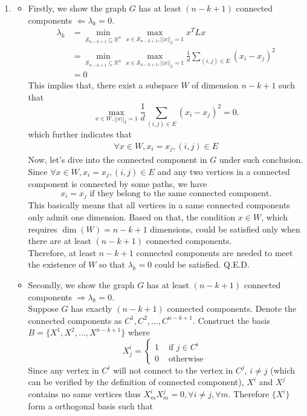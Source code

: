 \documentclass[english,onecolumn]{IEEEtran}
\newcommand{\Rbb}{\mathbb{R}}
\newcommand{\bigS}{\mathcal{S}}
\begin{document}
\begin{enumerate}
    \item 
    \begin{itemize}
    	\item Firstly, we show the graph $G$ has at least $(n-k+1)$ connected components $\Leftarrow \lambda_k=0$.
    		\begin{align*}
    			\lambda_k &= \min\limits_{\bigS_{n-k+1}\subseteq \Rbb^n}\max\limits_{x\in\bigS_{n-k+1},||x||_2=1} x^TLx\\
    			&= \min\limits_{\bigS_{n-k+1}\subseteq \Rbb^n}\max\limits_{x\in\bigS_{n-k+1},||x||_2=1} \frac{1}{d}\sum_{(i,j)\in E} (x_i-x_j)^2 \\
    			&= 0
    		\end{align*}
    		This implies that, there exist a  subspace $W$ of dimension $n-k+1$ such that 
    		$$\max\limits_{x\in W,||x||_2=1} \frac{1}{d}\sum_{(i,j)\in E} (x_i-x_j)^2 = 0.$$
    		which further indicates that 
    		\begin{align}\forall x \in W, x_i = x_j, (i,j)\in E\end{align}
    		Now, let's dive into the connected component in $G$ under such conclusion. Since $\forall x \in W, x_i = x_j, (i,j)\in E$ and any two vertices in a connected component is connected by some paths, we have 
    		$$x_i = x_j \text{ if they belong to the same connected component}.$$ 
    		This basically means that all vertices in a same connected components only admit one dimension. Based on that, the  condition $x \in W$, which requires $\dim(W) = n-k+1$ dimensions, could be satisfied only when there are at least $(n-k+1)$ connected components.
    		\\Therefore, at least $n-k+1$ connected components are needed to meet the existence of $W$ so that $\lambda_k = 0$ could be satisfied.  Q.E.D.
    \item Secondly, we show the graph $G$ has at least $(n-k+1)$ connected components $\Rightarrow \lambda_k=0$. \\
    Suppose $G$ has exactly $(n-k+1)$ connected components. Denote the connected components as $C^1, C^2,...,C^{n-k+1}$. Construct the basis $B = \{X^1,X^2,...,X^{n-k+1}\}$ where 
    $$X^i_j=\left\{
\begin{aligned}
 1 &\text{ if }  j\in C^i\\
0 & \text{ otherwise }
\end{aligned}
\right.$$
Since any vertex in $C^i$ will not connect to the vertex in $C^j$, $i\ne j$ (which can be verified by the definition of connected component), $X^i$ and $X^j$ contains no same vertices thus $X^i_m X^j_m = 0, \forall i\ne j,\forall m$. Therefore $\{X^i\}$ form a orthogonal basis such that 

\end{itemize}
\end{enumerate}
\end{document}
